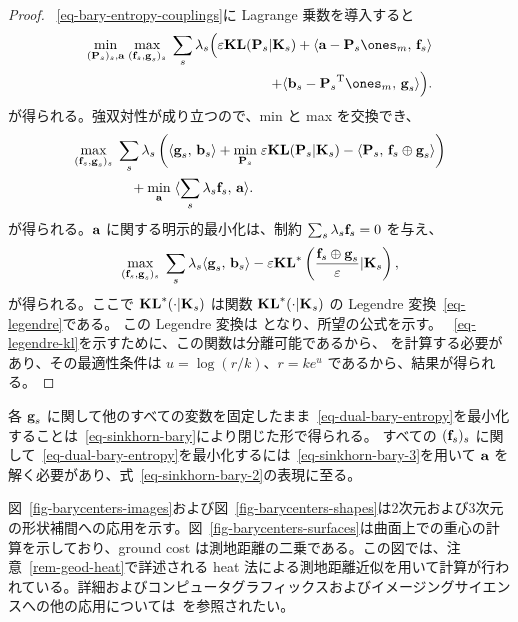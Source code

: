 \begin{proof} ~\eqref{eq-bary-entropy-couplings}に Lagrange 乗数を導入すると
	\begin{align*}
		\umin{ (\P_s)_s, \a }
		\umax{ ( \fD_s,\gD_s )_s }
		\sum_{s} \la_s \Big(
			\epsilon \KLD( \P_s|\K_s )
			+
			\dotp{\a - \P_s\ones_m}{ \fD_s } \\
		\qquad\qquad	+
			\dotp{\b_s - \transp{\P_s}\ones_m}{ \gD_s }
		\Big).
	\end{align*}
	が得られる。強双対性が成り立つので、min と max を交換でき、
		\begin{align*}
		&\underset{ ( \mathrm{\textbf{f}}_s,\mathrm{\textbf{g}}_s )_s }{\max}\;
			\sum_s \lambda_s \left( 
				 \langle \mathrm{\textbf{g}}_s,\,\mathrm{\textbf{b}}_s\rangle
		+
		\underset{\mathrm{\textbf{P}}_s}{\min}\; \varepsilon \mathrm{\textbf{KL}}( \mathrm{\textbf{P}}_s|\mathrm{\textbf{K}}_s ) - \langle \mathrm{\textbf{P}}_s,\,\mathrm{\textbf{f}}_s \oplus \mathrm{\textbf{g}}_s \rangle
		 \right) \\
	&\qquad\qquad	+ \underset{\mathrm{\textbf{a}}}{\min}\;
			\langle  \sum_{s} \lambda_s \mathrm{\textbf{f}}_s ,\,\mathrm{\textbf{a}}\rangle.
	\end{align*}
	が得られる。$\mathrm{\textbf{a}}$ に関する明示的最小化は、制約 $\sum_{s} \lambda_s \mathrm{\textbf{f}}_s=0$ を与え、
	\begin{align*}
		\underset{ ( \mathrm{\textbf{f}}_s,\mathrm{\textbf{g}}_s )_s }{\max}\;
			\sum_s \lambda_s
				 \langle \mathrm{\textbf{g}}_s,\,\mathrm{\textbf{b}}_s\rangle
		-
		\varepsilon \mathrm{\textbf{KL}}^*\left(  \frac{\mathrm{\textbf{f}}_s \oplus \mathrm{\textbf{g}}_s}{\varepsilon}|\mathrm{\textbf{K}}_s  \right),
	\end{align*}
	が得られる。ここで $\mathrm{\textbf{KL}}^*(\cdot|\mathrm{\textbf{K}}_s)$ は関数 $\mathrm{\textbf{KL}}^*(\cdot|\mathrm{\textbf{K}}_s)$ の Legendre 変換~\eqref{eq-legendre}である。
	この Legendre 変換は
	となり、所望の公式を示す。
	~\eqref{eq-legendre-kl}を示すために、この関数は分離可能であるから、
	を計算する必要があり、その最適性条件は $u=\log(r/k)$、\ie $r = k e^{u}$ であるから、結果が得られる。
\end{proof}

各 $\mathrm{\textbf{g}}_s$ に関して他のすべての変数を固定したまま~\eqref{eq-dual-bary-entropy}を最小化することは~\eqref{eq-sinkhorn-bary}により閉じた形で得られる。
すべての $(\mathrm{\textbf{f}}_s)_s$ に関して~\eqref{eq-dual-bary-entropy}を最小化するには~\eqref{eq-sinkhorn-bary-3}を用いて $\mathrm{\textbf{a}}$ を解く必要があり、式~\eqref{eq-sinkhorn-bary-2}の表現に至る。



図~\ref{fig-barycenters-images}および図~\ref{fig-barycenters-shapes}は2次元および3次元の形状補間への応用を示す。図~\ref{fig-barycenters-surfaces}は曲面上での重心の計算を示しており、ground cost は測地距離の二乗である。この図では、注意~\ref{rem-geod-heat}で詳述される heat 法による測地距離近似を用いて計算が行われている。詳細およびコンピュータグラフィックスおよびイメージングサイエンスへの他の応用については~\citep{2015-solomon-siggraph}を参照されたい。

